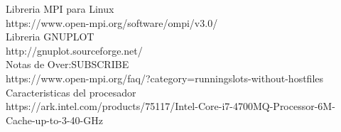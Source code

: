\documentclass[12pt]{article}
\begin{document}
\begin{titlepage}



Libreria MPI para Linux\\
https://www.open-mpi.org/software/ompi/v3.0/\\

Libreria GNUPLOT\\
http://gnuplot.sourceforge.net/\\

Notas de Over:SUBSCRIBE\\
https://www.open-mpi.org/faq/?category=runningslots-without-hostfiles\\

Caracteristicas del procesador\\
https://ark.intel.com/products/75117/Intel-Core-i7-4700MQ-Processor-6M-Cache-up-to-3-40-GHz\\






\end{titlepage}
\end{document}
